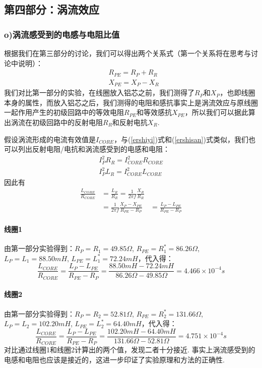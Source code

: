 \documentclass[UTF8]{ctexart}
\begin{document}
\subsection*{第四部分：涡流效应}
\subsubsection*{o)涡流感受到的电感与电阻比值}
根据我们在第三部分的讨论，我们可以得出两个关系式（第一个关系将在思考与讨论中说明）：
\begin{equation}
    \begin{aligned}
        &R_{PE}=R_P+R_R\\
        &X_{PE}=X_P-X_R
    \end{aligned}
\end{equation}
我们对比第一部分的实验，在线圈放入铝芯之前，我们测得了$R_P$和$X_P$，也即线圈本身的属性，而放入铝芯之后，我们测得的电阻和感抗事实上是涡流效应与原线圈一起作用产生的初级回路中的等效电阻$R_{PE}$和等效感抗$X_{PE}$，所以我们可以据此算出涡流在初级回路中的反射电阻$R_R$和反射电抗$X_R$.\par
假设涡流形成的电流有效值是$I_{CORE}$，与(\ref{ershiyi})式和(\ref{ershisan})式类似，我们也可以列出反射电阻/电抗和涡流感受到的电感和电阻：
\begin{equation}
\begin{aligned}
    I_P^2R_R=I_{CORE}^2R_{CORE}\\
    I_P^2L_R=I_{CORE}^2L_{CORE}
\end{aligned}
\end{equation}
因此有
\begin{equation}
    \begin{aligned}
    \frac{L_{CORE}}{R_{CORE}}&=\frac{L_R}{R_R}=\frac{1}{2\pi f}\frac{X_R}{R_R}\\
    &=\frac{1}{2\pi f}\frac{X_P-X_{PE}}{R_{PE}-R_P}
    &=\frac{L_P-L_{PE}}{R_{PE}-R_P}
    \end{aligned}
\end{equation}
\paragraph{线圈1}由第一部分实验得到：$R_P=R_1=49.85\Omega$, $R_{PE}=R_1^*=86.26\Omega$, $L_P=L_1=88.50mH$, $L_{PE}=L_1^*=72.24mH$，代入得：
\[\frac{L_{CORE}}{R_{CORE}}=\frac{L_P-L_{PE}}{R_{PE}-R_P}=\frac{88.50mH-72.24mH}{86.26\Omega-49.85\Omega}=4.466\times 10^{-4}s\]
\paragraph{线圈2}由第一部分实验得到：$R_P=R_2=52.81\Omega$, $R_{PE}=R_2^*=131.66\Omega$, $L_P=L_2=102.20mH$, $L_{PE}=L_2^*=64.40mH$，代入得：
\[\frac{L_{CORE}}{R_{CORE}}=\frac{L_P-L_{PE}}{R_{PE}-R_P}=\frac{102.20mH-64.40mH}{131.66\Omega-52.81\Omega}=4.751\times 10^{-4}s\]
对比通过线圈1和线圈2计算出的两个值，发现二者十分接近. 事实上涡流感受到的电感和电阻也应该是接近的，这进一步印证了实验原理和方法的正确性.
\end{document}
